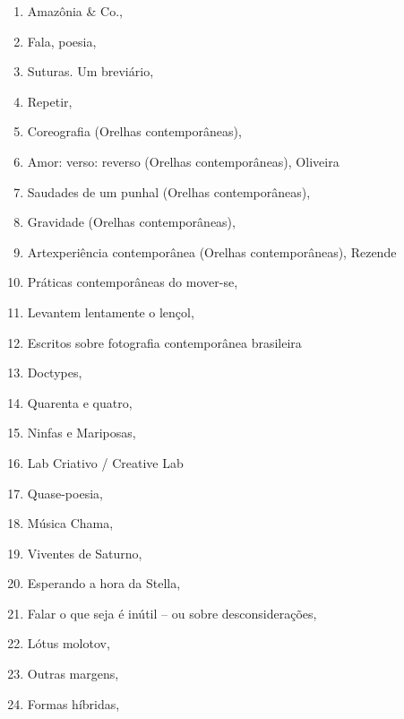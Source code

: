 \begin{multicols}{2}
\begin{enumerate}
\item Amazônia \& Co., {}
\item Fala, poesia, {}
\item Suturas. Um breviário, {}
\item Repetir, {}
\item Coreografia (Orelhas contemporâneas), {}
\item Amor: verso: reverso (Orelhas contemporâneas), {}Oliveira
\item Saudades de um punhal (Orelhas contemporâneas), {}
\item Gravidade (Orelhas contemporâneas), {}
\item Artexperiência contemporânea (Orelhas contemporâneas), {}Rezende
\item Práticas contemporâneas do mover-se, {}
\item Levantem lentamente o lençol, {}
\item Escritos sobre fotografia contemporânea brasileira
\item Doctypes, {}
\item Quarenta e quatro, {}
\item Ninfas e Mariposas, {}
\item Lab Criativo / Creative Lab
\item Quase-poesia, {}
\item Música Chama, {}
\item Viventes de Saturno, {}
\item Esperando a hora da Stella, {}
\item Falar o que seja é inútil – ou sobre desconsiderações, {}
\item Lótus molotov, {}
\item Outras margens, {}
\item Formas híbridas, {}

\end{enumerate}
\end{multicols}
